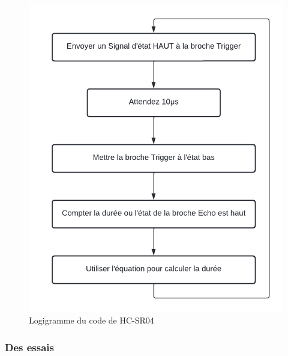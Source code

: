 \begin{figure}[!htbp]
    \centering
    \includegraphics[width=.7\linewidth]{assets/HC-SR04/diagram sans vibration.png}
    \caption{Logigramme du code de HC-SR04}
\end{figure}


\subsubsection{Des essais}

